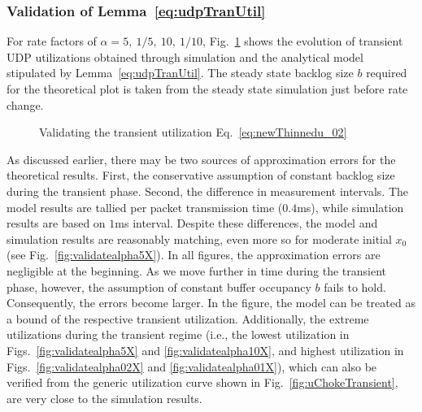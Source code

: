 \documentclass{IEEEtran}
\begin{document}
\vspace{5mm}

    \subsubsection{Validation of Lemma~\ref{eq:udpTranUtil}}
For rate factors of $\alpha=5,~1/5,~10, ~1/10$, Fig.~\ref{fig:validateTh1} shows the evolution of transient UDP utilizations obtained through simulation and the analytical model stipulated by Lemma~\ref{eq:udpTranUtil}. The steady state backlog size $b$ required for the theoretical plot is taken from the steady state simulation just before rate change.

    \begin{figure}[htb!]\centering
          \vspace{2mm}
          \vspace{2mm}
          \vspace{2mm}
          \caption{Validating the transient utilization Eq.~\eqref{eq:newThinnedu_02}}
\label{fig:validateTh1}
     \end{figure}

    As discussed earlier, there may be two sources of approximation errors for the theoretical results. First, the conservative assumption of constant backlog size during the transient phase. Second, the difference in measurement intervals. The model results are tallied per packet transmission time ($0.4$ms), while simulation results are based on $1$ms interval. Despite these differences, the model and simulation results are reasonably matching, even more so for moderate initial $x_0$ (see Fig.~\ref{fig:validatealpha5X}). In all figures, the approximation errors are negligible at the beginning. As we move further in time during the transient phase, however, the assumption of constant buffer occupancy $b$ fails to hold. Consequently, the errors become larger.  In the figure, the model can be treated as a bound of the respective transient utilization. Additionally, the extreme utilizations during the transient regime (i.e., the lowest utilization in Figs.~\ref{fig:validatealpha5X} and \ref{fig:validatealpha10X}, and highest utilization in Figs.~\ref{fig:validatealpha02X} and \ref{fig:validatealpha01X}), which can also be verified from the generic utilization curve shown in Fig.~\ref{fig:uChokeTransient}, are very close to the simulation results. 
\end{document}
